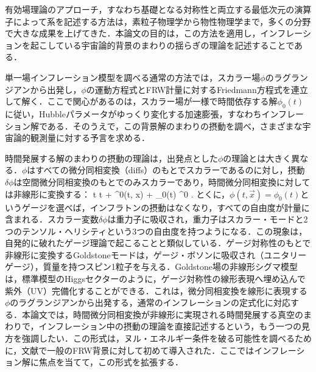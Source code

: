 有効場理論のアプローチ，すなわち基礎となる対称性と両立する最低次元の演算子によって系を記述する方法は，素粒子物理学から物性物理学まで，多くの分野で大きな成果を上げてきた．本論文の目的は，この方法を適用し，インフレーションを起こしている宇宙論的背景のまわりの揺らぎの理論を記述することである．

単一場インフレーション模型を調べる通常の方法では，スカラー場$\phi$のラグランジアンから出発し，$\phi$の運動方程式とFRW計量に対するFriedmann方程式を連立して解く．ここで関心があるのは，スカラー場が一様で時間依存する解$\phi_0(t)$に従い，Hubbleパラメータがゆっくり変化する加速膨張，すなわちインフレーション解である．そのうえで，この背景解のまわりの摂動を調べ，さまざまな宇宙論的観測量に対する予言を求める．

時間発展する解のまわりの摂動の理論は，出発点とした$\phi$の理論とは大きく異なる．$\phi$はすべての微分同相変換（diffs）のもとでスカラーであるのに対し，摂動$\delta\phi$は空間微分同相変換のもとでのみスカラーであり，時間微分同相変換に対しては非線形に変換する：
\be
t \to t + \xi^0(t, \vec x)   \qquad \delta\phi \to \delta\phi + \dot\phi_0(t) \xi^0 \;.
\ee
とくに，$\phi(t,\vec x)=\phi_0(t)$というゲージを選べば，インフラトンの摂動はなくなり，すべての自由度が計量に含まれる．スカラー変数$\delta\phi$は重力子に吸収され，重力子はスカラー・モードと2つのテンソル・ヘリシティという3つの自由度を持つようになる．この現象は，自発的に破れたゲージ理論で起こることと類似している．ゲージ対称性のもとで非線形に変換するGoldstoneモードは，ゲージ・ボソンに吸収され（ユニタリーゲージ），質量を持つスピン1粒子を与える．Goldstone場の非線形シグマ模型は，標準模型のHiggsセクターのように，ゲージ対称性の線形表現へ埋め込んで紫外（UV）完備化することができる．これは，微分同相変換を線形に表現する$\phi$のラグランジアンから出発する，通常のインフレーションの定式化に対応する．本論文では，時間微分同相変換が非線形に実現される時間発展する真空のまわりで，インフレーション中の摂動の理論を直接記述するという，もう一つの見方を強調したい．この形式は，ヌル・エネルギー条件を破る可能性を調べるために，文献\cite{Creminelli:2006xe}で一般のFRW背景に対して初めて導入された．ここではインフレーション解に焦点を当てて，この形式を拡張する．

